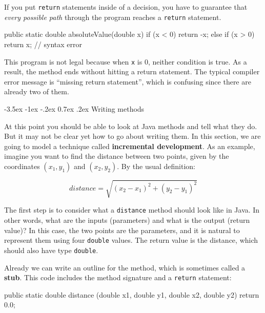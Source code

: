 \documentclass[12pt]{book}
\makeatletter
\theoremstyle{exercise}
\newcommand{\java}[1]{\verb"#1"}
\renewcommand{\section}{\@startsection{section}{1}{\z@}%
    {-3.5ex \@plus -1ex \@minus -.2ex}%
    {0.7ex \@plus.2ex}%
    {\normalfont\Large\bfseries}}
\newcommand{\java}[1]{\lstinline{#1}} %
\makeatother
\begin{document}
If you put \java{return} statements inside of a decision, you have to guarantee that {\em every possible path} through the program reaches a \java{return} statement.

\begin{code}
    public static double absoluteValue(double x) {
        if (x < 0) {
            return -x;
        } else if (x > 0) {
            return x;
        }
        // syntax error
    }
\end{code}

This program is not legal because when \java{x} is 0, neither condition is true.
As a result, the method ends without hitting a return statement.
The typical compiler error message is ``missing return statement'', which is confusing since there are already two of them.


\section{Writing methods}
\label{distance}


At this point you should be able to look at Java methods and tell what they do.
But it may not be clear yet how to go about writing them.
In this section, we are going to model a technique called {\bf incremental development}.
As an example, imagine you want to find the distance between two points, given by the coordinates $(x_1, y_1)$ and $(x_2, y_2)$.
By the usual definition:

\[ distance = \sqrt{(x_2 - x_1)^2 +(y_2 - y_1)^2} \]

The first step is to consider what a \java{distance} method should look like in Java.
In other words, what are the inputs (parameters) and what is the output (return value)?
In this case, the two points are the parameters, and it is natural to represent them using four \java{double} values.
The return value is the distance, which should also have type \java{double}.


Already we can write an outline for the method, which is sometimes called a {\bf stub}.
This code includes the method signature and a \java{return} statement:

\begin{code}
    public static double distance
            (double x1, double y1, double x2, double y2) {
        return 0.0;
    }
\end{code}
\end{document}
